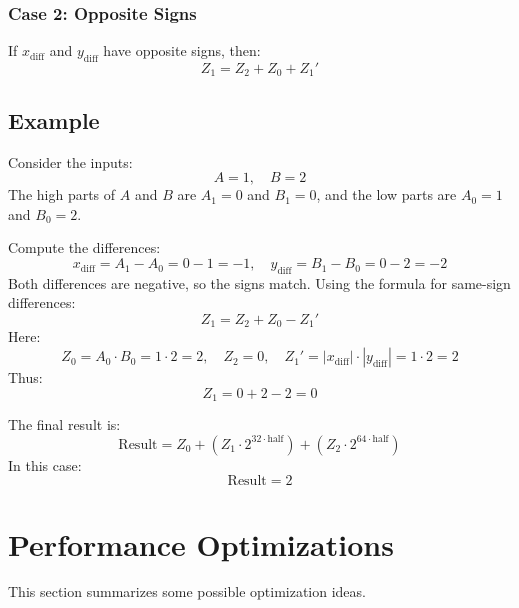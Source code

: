 \documentclass[12pt]{article}
\begin{document}
\subsubsection*{Case 2: Opposite Signs}
If \( x_{\text{diff}} \) and \( y_{\text{diff}} \) have opposite signs, then:
\[
Z_1 = Z_2 + Z_0 + Z_1'
\]

\subsection*{Example}
Consider the inputs:
\[
A = 1, \quad B = 2
\]
The high parts of \( A \) and \( B \) are \( A_1 = 0 \) and \( B_1 = 0 \), and the low parts are \( A_0 = 1 \) and \( B_0 = 2 \).

Compute the differences:
\[
x_{\text{diff}} = A_1 - A_0 = 0 - 1 = -1, \quad y_{\text{diff}} = B_1 - B_0 = 0 - 2 = -2
\]
Both differences are negative, so the signs match. Using the formula for same-sign differences:
\[
Z_1 = Z_2 + Z_0 - Z_1'
\]
Here:
\[
Z_0 = A_0 \cdot B_0 = 1 \cdot 2 = 2, \quad Z_2 = 0, \quad Z_1' = |x_{\text{diff}}| \cdot |y_{\text{diff}}| = 1 \cdot 2 = 2
\]
Thus:
\[
Z_1 = 0 + 2 - 2 = 0
\]

The final result is:
\[
\text{Result} = Z_0 + (Z_1 \cdot 2^{32 \cdot \text{half}}) + (Z_2 \cdot 2^{64 \cdot \text{half}})
\]
In this case:
\[
\text{Result} = 2
\]

\section{Performance Optimizations}

This section summarizes some possible optimization ideas.
\end{document}
